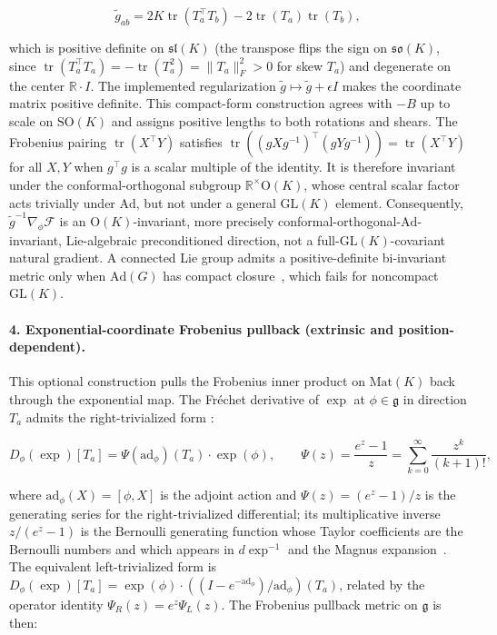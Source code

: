 \documentclass[twoside,11pt]{article}
\begin{document}
\begin{equation}
\tilde{g}_{ab} = 2K \operatorname{tr}(T_a^\top T_b) - 2\operatorname{tr}(T_a)\operatorname{tr}(T_b),
\label{eq:killing_metric}
\end{equation}

which is positive definite on $\mathfrak{sl}(K)$ (the transpose flips the sign on $\mathfrak{so}(K)$, since $\operatorname{tr}(T_a^\top T_a) = -\operatorname{tr}(T_a^2) = \|T_a\|_F^2 > 0$ for skew $T_a$) and degenerate on the center $\mathbb{R} \cdot I$. The implemented regularization $\tilde{g} \mapsto \tilde{g} + \epsilon I$ makes the coordinate matrix positive definite. This compact-form construction agrees with $-B$ up to scale on $\mathrm{SO}(K)$ and assigns positive lengths to both rotations and shears. The Frobenius pairing $\operatorname{tr}(X^\top Y)$ satisfies $\operatorname{tr}((gXg^{-1})^\top(gYg^{-1})) = \operatorname{tr}(X^\top Y)$ for all $X,Y$ when $g^\top g$ is a scalar multiple of the identity. It is therefore invariant under the conformal-orthogonal subgroup $\mathbb{R}^{\times}\mathrm{O}(K)$, whose central scalar factor acts trivially under $\mathrm{Ad}$, but not under a general $\mathrm{GL}(K)$ element. Consequently, $\tilde{g}^{-1}\nabla_\phi\mathcal{F}$ is an $\mathrm{O}(K)$-invariant, more precisely conformal-orthogonal-$\mathrm{Ad}$-invariant, Lie-algebraic preconditioned direction, not a full-$\mathrm{GL}(K)$-covariant natural gradient. A connected Lie group admits a positive-definite bi-invariant metric only when $\mathrm{Ad}(G)$ has compact closure~\citep{Milnor1976}, which fails for noncompact $\mathrm{GL}(K)$.

\paragraph{4. Exponential-coordinate Frobenius pullback (extrinsic and position-dependent).}
This optional construction pulls the Frobenius inner product on $\mathrm{Mat}(K)$ back through the exponential map. The Fréchet derivative of $\exp$ at $\phi \in \mathfrak{g}$ in direction $T_a$ admits the right-trivialized form \citep[\S2.7 / Theorem 5.4]{Hall2015}:

\begin{equation}
D_\phi(\exp)[T_a] = \Psi(\mathrm{ad}_\phi)(T_a) \cdot \exp(\phi), \qquad \Psi(z) = \frac{e^z - 1}{z} = \sum_{k=0}^{\infty} \frac{z^k}{(k+1)!},
\end{equation}

where $\mathrm{ad}_\phi(X) = [\phi, X]$ is the adjoint action and $\Psi(z) = (e^z - 1)/z$ is the generating series for the right-trivialized differential; its multiplicative inverse $z/(e^z-1)$ is the Bernoulli generating function whose Taylor coefficients are the Bernoulli numbers and which appears in $d\exp^{-1}$ and the Magnus expansion~\citep{Hall2015}. The equivalent left-trivialized form is $D_\phi(\exp)[T_a] = \exp(\phi) \cdot ((I - e^{-\mathrm{ad}_\phi})/\mathrm{ad}_\phi)(T_a)$, related by the operator identity $\Psi_R(z) = e^z \Psi_L(z)$. The Frobenius pullback metric on $\mathfrak{g}$ is then:
\end{document}

